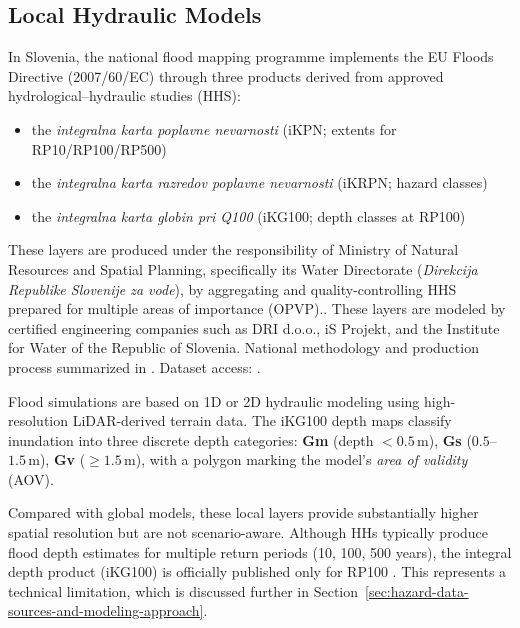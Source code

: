 \subsection{Local Hydraulic Models}

In Slovenia, the national flood mapping programme implements the EU Floods Directive (2007/60/EC) through three products derived from approved hydrological–hydraulic studies (HHS): 
\begin{itemize}
    \item the \emph{integralna karta poplavne nevarnosti} (iKPN; extents for RP10/RP100/RP500)
    \item the \emph{integralna karta razredov poplavne nevarnosti} (iKRPN; hazard classes)
    \item the \emph{integralna karta globin pri Q100} (iKG100; depth classes at RP100)
\end{itemize}

These layers are produced under the responsibility of Ministry of Natural Resources and Spatial Planning, specifically its Water Directorate (\textit{Direkcija Republike Slovenije za vode}), by aggregating and quality-controlling HHS prepared for multiple areas of importance (OPVP).\cite{si_ikg_posodabljanje_integralnih_kart_2015, si_ikg_flood_maps_methodology_2020}. These layers are modeled by certified engineering companies such as DRI d.o.o., iS Projekt, and the Institute for Water of the Republic of Slovenia. National methodology and production process summarized in \cite{si_ikg_posodabljanje_integralnih_kart_2015, si_ikg_flood_maps_methodology_2020,si_ikg_predhodna_ocena_poplavne_ogrozenosti_2019,si_ikg_pravilnik_2007}. Dataset access: \cite{si_ikg_data_2025}.

Flood simulations are based on 1D or 2D hydraulic modeling using high-resolution LiDAR-derived terrain data. The iKG100 depth maps classify inundation into three discrete depth categories: \textbf{Gm} (depth $<0.5$\,m), \textbf{Gs} ($0.5$–$1.5$\,m), \textbf{Gv} ($\ge 1.5$\,m), with a polygon marking the model’s \emph{area of validity} (AOV).\cite{si_ikg_flood_maps_methodology_2020} 

Compared with global models, these local layers provide substantially higher spatial resolution but are not scenario-aware. Although HHs typically produce flood depth estimates for multiple return periods (10, 100, 500 years), the integral depth product (iKG100) is officially published only for RP100 \cite{si_ikg_data_2025}. This represents a technical limitation, which is discussed further in Section~\ref{sec:hazard-data-sources-and-modeling-approach}.

